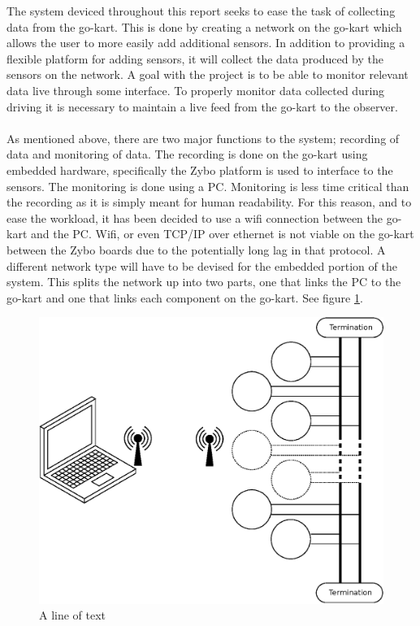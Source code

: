 The system deviced throughout this report seeks to ease the task of collecting data from the go-kart.
This is done by creating a network on the go-kart which allows the user to more easily add additional sensors.
In addition to providing a flexible platform for adding sensors, it will collect the data produced by the sensors on the network.
A goal with the project is to be able to monitor relevant data live through some interface.
To properly monitor data collected during driving it is necessary to maintain a live feed from the go-kart to the observer.
\\~\\
As mentioned above, there are two major functions to the system; recording of data and monitoring of data.
The recording is done on the go-kart using embedded hardware, specifically the Zybo platform is used to interface to the sensors.
The monitoring is done using a PC.
Monitoring is less time critical than the recording as it is simply meant for human readability.
For this reason, and to ease the workload, it has been decided to use a wifi connection between the go-kart and the PC.
Wifi, or even TCP/IP over ethernet is not viable on the go-kart between the Zybo boards due to the potentially long lag in that protocol.
A different network type will have to be devised for the embedded portion of the system.
This splits the network up into two parts, one that links the PC to the go-kart and one that links each component on the go-kart.
See figure \ref{fig:basic_network}.

\begin{figure}
	\includegraphics[width=.75\linewidth]{graphics/basic_network}
	\caption{A line of text}
	\label{fig:basic_network}
\end{figure}


